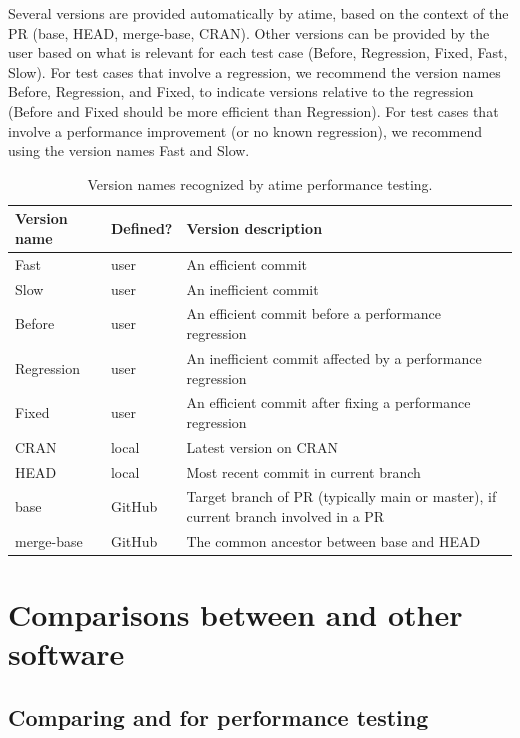 Several versions are provided automatically by atime, based on the context of the PR (base, HEAD, merge-base, CRAN).
Other versions can be provided by the user based on what is relevant for each test case (Before, Regression, Fixed, Fast, Slow).
For test cases that involve a regression, we recommend the version names Before, Regression, and Fixed, to indicate versions relative to the regression (Before and Fixed should be more efficient than Regression).
For test cases that involve a performance improvement (or no known regression), we recommend using the version names Fast and Slow.
\begin{table}[t]
        \centering
            \caption{\label{tab:version-labels}Version names recognized by atime performance testing. }
        \begin{tabular}    
        {|m{2.2cm}|m{1.5cm}|m{9cm}|}
  \hline
      \textbf{Version name} & \textbf{Defined?} & \textbf{Version description} \\
  \hline
  Fast & user & An efficient commit \\
  \hline
  Slow & user & An inefficient commit\\
  \hline
  Before & user & An efficient commit before a performance regression  \\
  \hline
  Regression & user & An inefficient commit affected by a performance regression \\
  \hline  
   Fixed & user & An efficient commit after  fixing a performance regression \\
  \hline  
  CRAN & local & Latest version on CRAN  \\
  \hline
  HEAD & local &  Most recent commit in current branch \\
  \hline
  base & GitHub & Target branch of PR (typically main or master), if current branch involved in a PR \\
  \hline
  merge-base & GitHub & The common ancestor between base and HEAD \\
  \hline
    \end{tabular}
\end{table}





\section{Comparisons between  and other software}

\subsection{Comparing  and   for performance testing}

